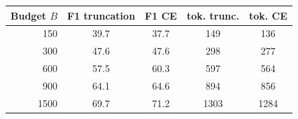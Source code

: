 \begin{tabular}{rcccc}
\hline
Budget $B$ & F1 truncation & F1 CE & tok. trunc. & tok. CE \\
\hline
150 & 39.7 & 37.7 & 149 & 136 \\
300 & 47.6 & 47.6 & 298 & 277 \\
600 & 57.5 & 60.3 & 597 & 564 \\
900 & 64.1 & 64.6 & 894 & 856 \\
1500 & 69.7 & 71.2 & 1303 & 1284 \\
\hline
\end{tabular}
